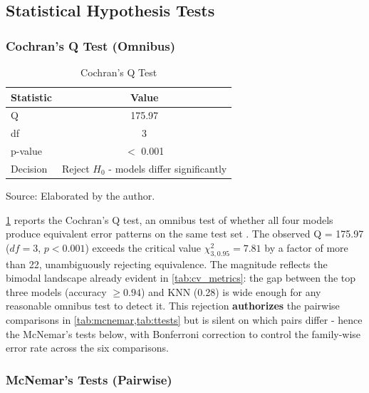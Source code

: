 \documentclass[alpha-refs,english]{RBCA_v3.0}
\begin{document}
\subsection{Statistical Hypothesis Tests}

\subsubsection{Cochran's Q Test (Omnibus)}

\begin{table}[ht]
    \centering
    \begin{threeparttable}
    \caption{Cochran's Q Test}
    \label{tab:cochran}
    \begin{tabular}{lc}
        \toprule
        Statistic & Value \\
        \midrule
        Q         & 175.97 \\
        df        & 3 \\
        p-value   & $<$ 0.001 \\
        Decision  & Reject $H_0$ - models differ significantly \\
        \bottomrule
    \end{tabular}
    \begin{tablenotes}
        \footnotesize
        \item Source: Elaborated by the author.
    \end{tablenotes}
    \end{threeparttable}
\end{table}

\cref{tab:cochran} reports the Cochran's Q test, an omnibus test of whether 
all four models produce equivalent error patterns on the same test set 
\citep{Cochran1950}. The observed Q = 175.97 ($df = 3$, $p < 0.001$) exceeds 
the critical value $\chi^2_{3, 0.95} = 7.81$ by a factor of more than 22, 
unambiguously rejecting equivalence. The magnitude reflects the bimodal 
landscape already evident in \cref{tab:cv_metrics}: the gap between the top 
three models (accuracy $\geq 0.94$) and KNN (0.28) is wide enough for any 
reasonable omnibus test to detect it. This rejection \textbf{authorizes} the 
pairwise comparisons in \cref{tab:mcnemar,tab:ttests} but is silent on 
which pairs differ - hence the McNemar's tests below, with Bonferroni 
correction to control the family-wise error rate across the six 
comparisons.

\subsubsection{McNemar's Tests (Pairwise)}
\end{document}
